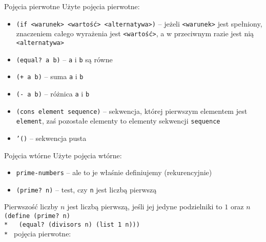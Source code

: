 \documentclass{beamer}
\begin{document}
\begin{frame}{Pojęcia pierwotne}
  Użyte pojęcia pierwotne: \pause
  \begin{itemize}
  \item \texttt{(if <warunek> <wartość> <alternatywa>)} -- jeżeli
    \texttt{<warunek>} jest spełniony, znaczeniem całego wyrażenia jest
    \texttt{<wartość>}, a w przeciwnym razie jest nią \texttt{<alternatywa>}\pause
  \item \texttt{(equal? a b)} -- \texttt{a} i \texttt{b} są równe\pause
  \item \texttt{(+ a b)} -- suma \texttt{a} i \texttt{b}\pause
  \item \texttt{(- a b)} -- różnica \texttt{a} i \texttt{b}\pause
  \item \texttt{(cons element sequence)} -- sekwencja, której pierwszym
    elementem jest \texttt{element}, zaś pozostałe elementy to elementy
    sekwencji \texttt{sequence}\pause
  \item \texttt{'()} -- sekwencja pusta
  \end{itemize}
\end{frame}

\begin{frame}{Pojęcia wtórne}
  Użyte pojęcia wtórne:\pause
  \begin{itemize}
  \item \texttt{prime-numbers} -- ale to je właśnie definiujemy
    (rekurencyjnie) \pause
  \item \texttt{(prime? n)} -- test, czy \texttt{n} jest liczbą pierwszą
  \end{itemize}
\end{frame}

\begin{frame}{Pierwszość liczby}
  $n$ jest liczbą pierwszą, jeśli jej jedyne podzielniki to $1$ oraz $n$\pause
  \texttt{
(define (prime? n)\\*
\ \ (equal? (divisors n) (list 1 n)))\\*
    }\pause
  pojęcia pierwotne:\pause
  
  
  
\end{frame}
\end{document}
